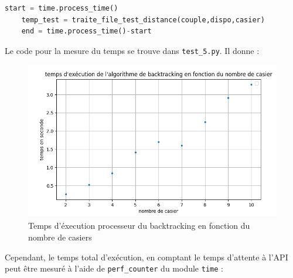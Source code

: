 \documentclass[11pt]{article}
\begin{document}
\begin{lstlisting}[language=Python, caption={Mesure du temps d'exécution de \texttt{traite\_file\_test\_distance}}]
    start = time.process_time()
    temp_test = traite_file_test_distance(couple,dispo,casier)
    end = time.process_time()-start
\end{lstlisting}
\newpage
Le code pour la mesure du temps se trouve dans \texttt{test\_5.py}. Il donne :

\begin{figure}[h]
     \centering
     \includegraphics[scale=0.6]{graph_test5_process_time.png}
     \caption{Temps d'éxecution processeur du backtracking en fonction du nombre de casiers} 
\end{figure}

Cependant, le temps total d'exécution, en comptant le temps d'attente à l'API peut être mesuré à l'aide de \texttt{perf\_counter} du module \texttt{time} :
\end{document}
